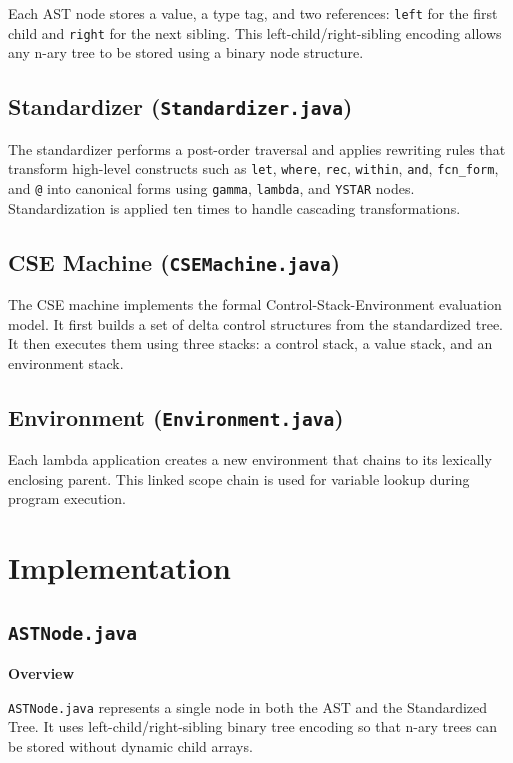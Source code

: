 \documentclass[12pt,a4paper]{article}
\begin{document}
Each AST node stores a value, a type tag, and two references: \texttt{left} for the first child and \texttt{right} for the next sibling. This left-child/right-sibling encoding allows any n-ary tree to be stored using a binary node structure.

\subsection{Standardizer (\texttt{Standardizer.java})}

The standardizer performs a post-order traversal and applies rewriting rules that transform high-level constructs such as \texttt{let}, \texttt{where}, \texttt{rec}, \texttt{within}, \texttt{and}, \texttt{fcn\_form}, and \texttt{@} into canonical forms using \texttt{gamma}, \texttt{lambda}, and \texttt{YSTAR} nodes. Standardization is applied ten times to handle cascading transformations.

\subsection{CSE Machine (\texttt{CSEMachine.java})}

The CSE machine implements the formal Control-Stack-Environment evaluation model. It first builds a set of delta control structures from the standardized tree. It then executes them using three stacks: a control stack, a value stack, and an environment stack.

\subsection{Environment (\texttt{Environment.java})}

Each lambda application creates a new environment that chains to its lexically enclosing parent. This linked scope chain is used for variable lookup during program execution.

\section{Implementation}

\subsection{\texttt{ASTNode.java}}

\textbf{Overview}

\texttt{ASTNode.java} represents a single node in both the AST and the Standardized Tree. It uses left-child/right-sibling binary tree encoding so that n-ary trees can be stored without dynamic child arrays.
\end{document}
